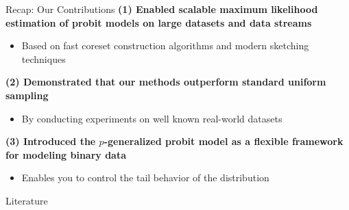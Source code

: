 \documentclass[gray]{beamer}
\begin{document}
\begin{frame}{Recap: Our Contributions} \pause
    \textbf{(1) Enabled scalable maximum likelihood estimation of
        probit models on large datasets and data streams}
    \begin{itemize}
        \item Based on fast coreset construction algorithms and modern sketching techniques
    \end{itemize}

    \pause

    \vspace{\fill}

    \textbf{(2) Demonstrated that our methods outperform standard
        uniform sampling}
    \begin{itemize}
        \item By conducting experiments on well known real-world datasets
    \end{itemize}

    \pause

    \vspace{\fill}

    \textbf{(3) Introduced the $p$-generalized probit model as a
        flexible framework for modeling binary data}
    \begin{itemize}
        \item Enables you to control the tail behavior of the distribution
    \end{itemize}
\end{frame}


\begin{frame}{Literature}
    
    
\end{frame}
\end{document}
